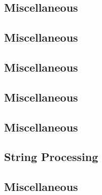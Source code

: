 \subsection{Miscellaneous}
\raggedbottom
\vspace{-.7\baselineskip}\hrulefill
\vspace{0.1\baselineskip}\subsection{Miscellaneous}
\raggedbottom
\vspace{-.7\baselineskip}\hrulefill
\vspace{0.1\baselineskip}\subsection{Miscellaneous}
\raggedbottom
\vspace{-.7\baselineskip}\hrulefill
\vspace{0.1\baselineskip}\subsection{Miscellaneous}
\raggedbottom
\vspace{-.7\baselineskip}\hrulefill
\vspace{0.1\baselineskip}\subsection{Miscellaneous}
\raggedbottom
\vspace{-.7\baselineskip}\hrulefill
\vspace{0.1\baselineskip}\subsection{String Processing}
\raggedbottom
\vspace{-.7\baselineskip}\hrulefill
\vspace{0.1\baselineskip}\subsection{Miscellaneous}
\raggedbottom
\vspace{-.7\baselineskip}\hrulefill
\vspace{0.1\baselineskip}
